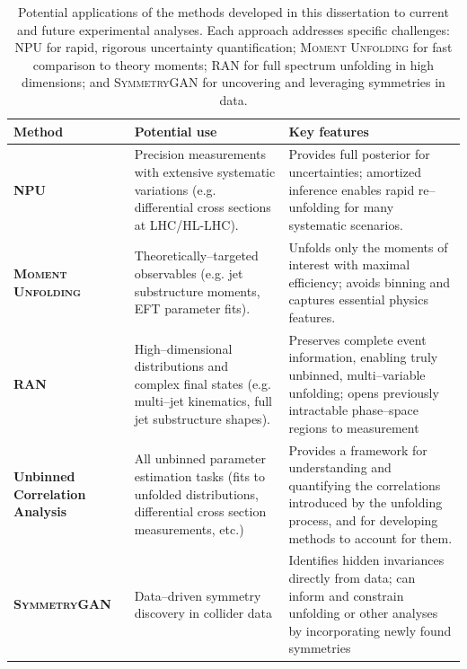 \begin{landscape}
        \begin{table}
            \centering
            \caption[Applications of presented methods to experimental scenarios.]{
                Potential applications of the methods developed in this dissertation to current and future experimental analyses. Each approach addresses specific challenges: NPU for rapid, rigorous uncertainty quantification; \textsc{Moment Unfolding} for fast comparison to theory moments; RAN for full spectrum unfolding in high dimensions; and \textsc{SymmetryGAN} for uncovering and leveraging symmetries in data.
            }
            \label{tab:method_applications}
            \begin{tabular}{p{} p{} p{}}
                \textbf{Method} & \textbf{Potential use} & \textbf{Key features} \\
                \hline
                \textbf{NPU}
                & Precision measurements with extensive systematic variations (e.g. differential cross sections at LHC/HL-LHC).
                & Provides full posterior for uncertainties; amortized inference enables rapid re--unfolding for many systematic scenarios. \\
                \textbf{\textsc{Moment Unfolding}}
                & Theoretically--targeted observables (e.g. jet substructure moments, EFT parameter fits).
                & Unfolds only the moments of interest with maximal efficiency; avoids binning and captures essential physics features. \\
                \textbf{RAN}
                & High--dimensional distributions and complex final states (e.g. multi--jet kinematics, full jet substructure shapes).
                & Preserves complete event information, enabling truly unbinned, multi--variable unfolding; opens previously intractable phase--space regions to measurement \\
                \textbf{Unbinned Correlation Analysis}
                & All unbinned parameter estimation tasks (fits to unfolded distributions, differential cross section measurements, etc.)
                & Provides a framework for understanding and quantifying the correlations introduced by the unfolding process, and for developing methods to account for them. \\
                \textbf{\textsc{SymmetryGAN}}
                & Data--driven symmetry discovery in collider data
                & Identifies hidden invariances directly from data; can inform and constrain unfolding or other analyses by incorporating newly found symmetries\\
            \end{tabular}

        \end{table}
    \end{landscape}
